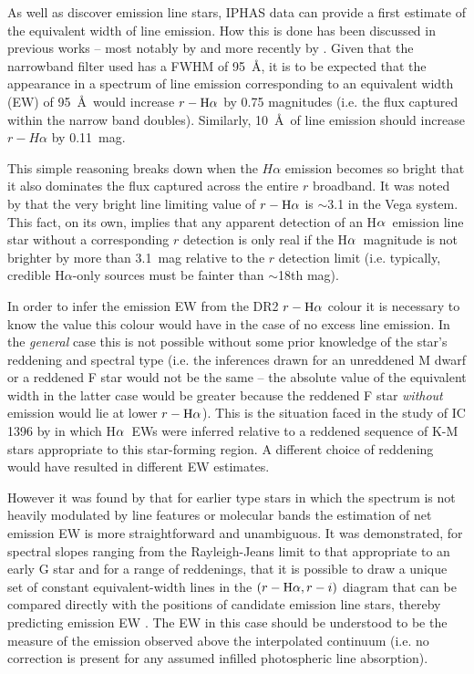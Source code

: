 \documentclass[a4paper,useAMS,usenatbib]{mn2e}
\def\ha{\mbox{H$\rm \alpha$}}
\begin{document}
{ \bf

As well as discover emission line stars, IPHAS data can provide a
first estimate of the equivalent width of line emission.
How this is done has been discussed in previous works 
-- most notably by \citet{Drew2005}
and more recently by \cite{Barentsen2011a}.
Given that the narrowband filter used has a FWHM of 95~\AA ,
it is to be expected that the appearance
in a spectrum of line emission corresponding to an equivalent width (EW)
of 95~\AA\ would increase $r - \ha$ by 0.75 magnitudes
(i.e. the flux captured within the narrow band doubles).
Similarly, 10~\AA\ of line emission
should increase $r - H\alpha$ by 0.11~mag.

This simple reasoning breaks down
when the $H\alpha$ emission becomes so bright
that it also dominates the flux captured across the entire $r$ broadband.
It was noted by \cite{Drew2005}
that the very bright line limiting value 
of $r - \ha$ is $\sim$3.1 in the Vega system.
This fact, on its own, implies that any apparent detection
of an \ha\ emission line star without a corresponding $r$ 
detection is only real if the \ha\ magnitude is not brighter 
by more than 3.1~mag relative to the $r$ detection limit
(i.e. typically, credible H$\alpha$-only sources
must be fainter than $\sim$18th mag).  

In order to infer the emission EW from the DR2 $r - \ha$ colour
it is necessary to know the value this colour would have
in the case of no excess line emission.
In the {\em general} case this is not possible
without some prior knowledge of the star's reddening and spectral type
(i.e. the inferences drawn for an unreddened M dwarf or
a reddened F star would not be the same -- the absolute value of the 
equivalent width in the latter case would be greater because the 
reddened F star {\em without} emission would lie at lower $r -\ha$).
This is the situation faced in the study of IC 1396 by
\cite{Barentsen2011a} in which \ha\ EWs were inferred
relative to a reddened sequence of K-M stars
appropriate to this star-forming region.
A different choice of reddening would have resulted
in different EW estimates.

However it was found by \cite{Drew2005}
that for earlier type stars in which the spectrum
is not heavily modulated by line features or molecular bands
the estimation of net emission EW is more straightforward and unambiguous.  
It was demonstrated, for spectral slopes ranging
from the Rayleigh-Jeans limit to that appropriate to an early G star
and for a range of reddenings,
that it is possible to draw a unique set of constant equivalent-width 
lines in the $(r - \ha, r - i)$ diagram
that can be compared directly with the positions
of candidate emission line stars,
thereby predicting emission EW \citep[see fig.~6, ][]{Drew2005}.
The EW in this case should be understood
to be the measure of the emission observed
above the interpolated continuum
(i.e. no correction is present
for any assumed infilled photospheric line absorption).

}
\end{document}
